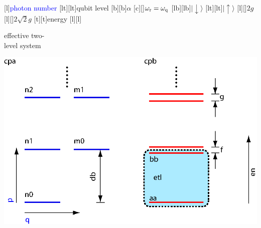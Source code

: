 

 \figstyle
 [l]{\textcolor{Blue}{photon number}}
 [lt][lt]{\textcolor{Cerulean}{qubit level}}
 [b][b]{$\alpha$}
 [c][]{$\omega_{\text{r}}=\omega_\text{q}$}
 [lb][lb]{$\lvert\downarrow\rangle$}
 [lt][lt]{$\lvert\uparrow\rangle$}
 [l][]{$2 g$}
 [l][]{$2\sqrt{2} g$}
 [t][t]{energy}
 [l][l]{\begin{minipage}{1 in}effective two-\\level system\end{minipage}}
 \includegraphics[height=2.5 in]{jc.eps}

